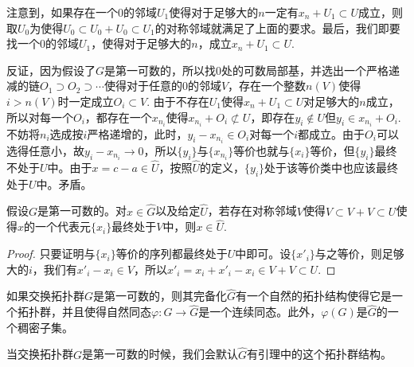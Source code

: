 \begin{para}
	注意到，如果存在一个$0$的邻域$U_1$使得对于足够大的$n$一定有$x_n+U_1\subset U$成立，则取$U_0$为使得$U_0\subset U_0+U_0\subset U_1$的对称邻域就满足了上面的要求。最后，我们即要找一个$0$的邻域$U_1$，使得对于足够大的$n$，成立$x_n+U_1\subset U$.

	反证，因为假设了$G$是第一可数的，所以找$0$处的可数局部基，并选出一个严格递减的链$O_1\supset O_2\supset \cdots$使得对于任意的$0$的邻域$V$，存在一个整数$n(V)$使得$i>n(V)$时一定成立$O_i\subset V$. 由于不存在$U_1$使得$x_n+U_1\subset U$对足够大的$n$成立，所以对每一个$O_i$，都存在一个$x_{n_i}$使得$x_{n_i}+O_i\not\subset U$，即存在$y_{i}\not\in U$但$y_i\in x_{n_i}+O_i$. 不妨将$n_i$选成按$i$严格递增的，此时，$y_i-x_{n_i}\in O_i$对每一个$i$都成立。由于$O_i$可以选得任意小，故$y_i-x_{n_i}\to 0$，所以$\{y_i\}$与$\{x_{n_i}\}$等价也就与$\{x_i\}$等价，但$\{y_i\}$最终不处于$U$中。由于$x=c-a\in \hat{U}$，按照$\hat{U}$的定义，$\{y_i\}$处于该等价类中也应该最终处于$U$中。矛盾。
\end{para}

\begin{lem}\label{lem:11}
	假设$G$是第一可数的。对$x\in \hat{G}$以及给定$\hat{U}$，若存在对称邻域$V$使得$V\subset V+V\subset U$使得$x$的一个代表元$\{x_i\}$最终处于$V$中，则$x\in\hat{U}$.
\end{lem}

\begin{proof}
	只要证明与$\{x_i\}$等价的序列都最终处于$U$中即可。设$\{x'_i\}$与之等价，则足够大的$i$，我们有$x'_i-x_i\in V$，所以$x'_i=x_i+x'_i-x_i\in V+V\subset U$. 
\end{proof}

\begin{pro}
	如果交换拓扑群$G$是第一可数的，则其完备化$\hat G$有一个自然的拓扑结构使得它是一个拓扑群，并且使得自然同态$\varphi:G\to \hat G$是一个连续同态。此外，$\varphi(G)$是$\hat{G}$的一个稠密子集。
\end{pro}

当交换拓扑群$G$是第一可数的时候，我们会默认$\hat G$有引理中的这个拓扑群结构。

